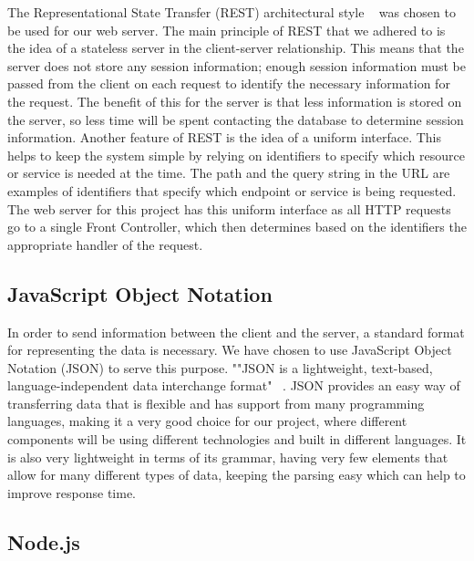 \documentclass[12pt]{report}
\let\Oldsubsection\subsection
\renewcommand{\subsection}{\FloatBarrier\Oldsubsection}
\begin{document}

The Representational State Transfer (REST) architectural style ~\autocite{RESTARCHSTYLE} was chosen to be used
for our web server. The main principle of REST that we adhered to is the idea of a stateless
server in the client-server relationship. This means that the server does not store any session
information; enough session information must be passed from the client on each request to
identify the necessary information for the request. The benefit of this for the server is that less
information is stored on the server, so less time will be spent contacting the database to
determine session information. Another feature of REST is the idea of a uniform interface. This
helps to keep the system simple by relying on identifiers to specify which resource or service is
needed at the time. The path and the query string in the URL are examples of identifiers that
specify which endpoint or service is being requested. The web server for this project has this
uniform interface as all HTTP requests go to a single Front Controller, which
then determines based on the identifiers the appropriate handler of the request.

\subsection{JavaScript Object Notation} \label{javascript-object-notation}

In order to send information between the client and the server, a standard format for
representing the data is necessary. We have chosen to use JavaScript Object Notation (JSON) to
serve this purpose. ""JSON is a lightweight, text-based, language-independent data interchange
format" ~\autocite{JSONREF}. JSON provides an easy way of transferring data that is flexible and has support
from many programming languages, making it a very good choice for our project, where
different components will be using different technologies and built in different languages. It is
also very lightweight in terms of its grammar, having very few elements that allow for many
different types of data, keeping the parsing easy which can help to improve response time.

\subsection{Node.js} \label{node.js}
\end{document}
